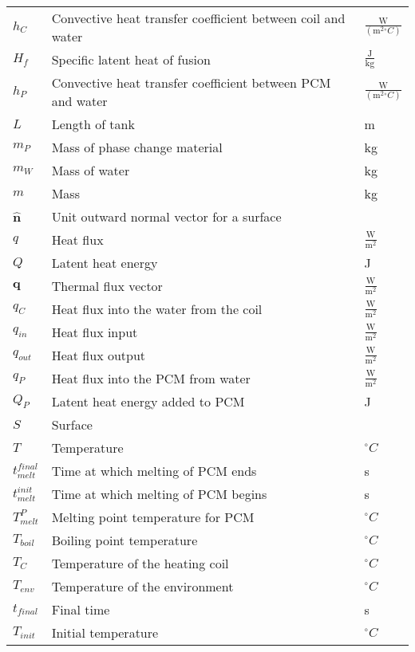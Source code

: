 \documentclass[12pt]{article}
\begin{document}
\begin{longtable*}{l l l}
\\
$h_{C}$ & Convective heat transfer coefficient between coil and water & $\frac{\text{W}}{(\text{m}^{2}{}^{\circ}C)}$
\\
$H_{f}$ & Specific latent heat of fusion & $\frac{\text{J}}{\text{kg}}$
\\
$h_{P}$ & Convective heat transfer coefficient between PCM and water & $\frac{\text{W}}{(\text{m}^{2}{}^{\circ}C)}$
\\
$L$ & Length of tank & m
\\
$m_{P}$ & Mass of phase change material & kg
\\
$m_{W}$ & Mass of water & kg
\\
$m$ & Mass & kg
\\
$\mathbf{\hat{n}}$ & Unit outward normal vector for a surface & 
\\
$q$ & Heat flux & $\frac{\text{W}}{\text{m}^{2}}$
\\
$Q$ & Latent heat energy & J
\\
$\mathbf{q}$ & Thermal flux vector & $\frac{\text{W}}{\text{m}^{2}}$
\\
$q_{C}$ & Heat flux into the water from the coil & $\frac{\text{W}}{\text{m}^{2}}$
\\
$q_{in}$ & Heat flux input & $\frac{\text{W}}{\text{m}^{2}}$
\\
$q_{out}$ & Heat flux output & $\frac{\text{W}}{\text{m}^{2}}$
\\
$q_{P}$ & Heat flux into the PCM from water & $\frac{\text{W}}{\text{m}^{2}}$
\\
$Q_{P}$ & Latent heat energy added to PCM & J
\\
$S$ & Surface & 
\\
$T$ & Temperature & ${}^{\circ}C$
\\
$t_{melt}^{final}$ & Time at which melting of PCM ends & s
\\
$t_{melt}^{init}$ & Time at which melting of PCM begins & s
\\
$T_{melt}^{P}$ & Melting point temperature for PCM & ${}^{\circ}C$
\\
$T_{boil}$ & Boiling point temperature & ${}^{\circ}C$
\\
$T_{C}$ & Temperature of the heating coil & ${}^{\circ}C$
\\
$T_{env}$ & Temperature of the environment & ${}^{\circ}C$
\\
$t_{final}$ & Final time & s
\\
$T_{init}$ & Initial temperature & ${}^{\circ}C$
\\

\end{longtable*}
\end{document}
